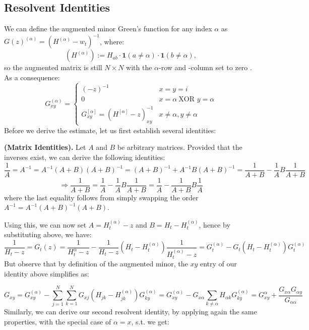 \documentclass[11pt]{article}
\newenvironment{boxt}[1]
  {\begin{mdframed}\noindent\textbf{#1}\normalfont\space}
  {\end{mdframed}}
\begin{document}
\subsection*{Resolvent Identities}
We can define the augmented minor Green's function for any index $\alpha$ as $G(z)^{(\alpha)} = (H^{(\alpha)}-w_t)^{-1}$, where: $$\left(H^{(\alpha)}\right):=H_{ab}\cdot \mathbf{1}(a\neq \alpha)\cdot \mathbf{1}(b\neq \alpha),$$ 
so the augmented matrix is still $N\times N$ with the $\alpha$-row and -column set to zero \cite{dynamic}. As a consequence: 
\begin{equation*}
G_{xy}^{(\alpha)} = \left\{\begin{array}{cc}
  (-z)^{-1}  & x=y=i\\
  0 & x=\alpha\ \text{XOR } y = \alpha\\
  G_{xy}^{[\alpha]} = (H^{[\alpha]}-z)_{xy}^{-1} & x\neq \alpha, y\neq \alpha
  \end{array}
  \right.
\end{equation*}
Before we derive the estimate, let us first establish several identities:

\begin{boxt}{(Matrix Identities).}
Let $A$ and $B$ be arbitrary matrices. Provided that the inverses exist, we can derive the following identities: 
$$\frac{1}{A}=A^{-1} =A^{-1}(A+B)(A+B)^{-1}=(A+B)^{-1}+A^{-1}B(A+B)^{-1} = \frac{1}{A+B}-\frac{1}{A}B\frac{1}{A+B}$$
\begin{equation*}\Rightarrow \frac{1}{A+B}=\frac{1}{A}-\frac{1}{A}B\frac{1}{A+B} = \frac{1}{A}-\frac{1}{A+B}B\frac{1}{A}\tag{2.4}\end{equation*}
where the last equality follows from simply swapping the order $A^{-1}=A^{-1}(A+B)^{-1}(A+B)$. \end{boxt}

\noindent Using this, we can now set $A = H_t^{(\alpha)}-z$ and $B  = H_t-H_t^{(\alpha)}$, hence by substituting above, we have: $$\frac{1}{H_t-z} = G_{t}(z) = \frac{1}{H_t^{\alpha}-z}-\frac{1}{H_t-z}\left(H_t-H_t^{(\alpha)}\right)\frac{1}{H_t^{(\alpha)}-z} = G^{(\alpha)}_t-G_t(H_t-H_t^{(\alpha)})G_t^{(\alpha)}$$
But observe that by definition of the augmented minor, the $xy$ entry of our identity above simplifies as: 

\begin{equation*}
G_{xy}=G_{xy}^{(\alpha)}-\sum_{j=1}^N\sum_{k=1}^NG_{xj}(H_{jk}-H^{(\alpha)}_{jk})G_{ky}^{(\alpha)} = G_{xy}^{(\alpha)} - G_{x\alpha}\sum_{k\neq \alpha} H_{\alpha k}G_{ky}^{(\alpha)} = G_{xy}^{\alpha}+\frac{G_{x\alpha}G_{\alpha y}}{G_{\alpha\alpha}}
\end{equation*}
Similarly, we can derive our second resolvent identity, by applying again the same properties, with the special case of $\alpha = x$, s.t. we get:
\end{document}
